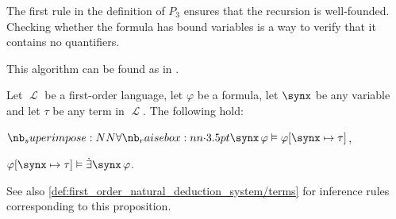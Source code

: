 \begin{comments}
  \item The first rule in the definition of \( P_3 \) ensures that the recursion is well-founded. Checking whether the formula has bound variables is a way to verify that it contains no quantifiers.
  \item This algorithm can be found as  in \cite{notebook:code}.
\end{comments}

\begin{proposition}\label{thm:quantifier_satisfiability}
  Let \( \mscrL \) be a first-order language, let \( \varphi \) be a formula, let \( \synx \) be any variable and let \( \tau \) be any term in \( \mscrL \). The following hold:

  \begin{thmenum}
     \( \qforall \synx \varphi \vDash \varphi[\synx \mapsto \tau] \),

     \( \varphi[\synx \mapsto \tau] \vDash \qexists \synx \varphi \).
  \end{thmenum}
\end{proposition}
\begin{comments}
  \item See also \cref{def:first_order_natural_deduction_system/terms} for inference rules corresponding to this proposition.
\end{comments}
